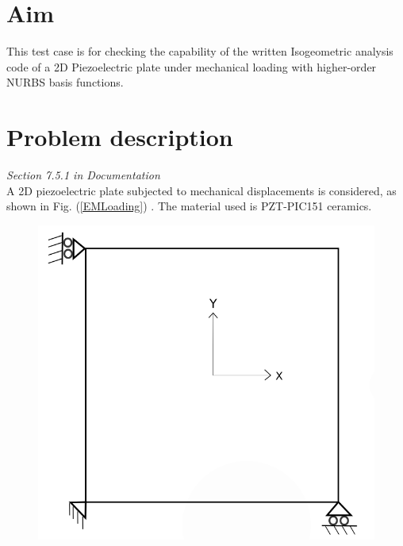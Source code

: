 \documentclass[12pt]{article}
\begin{document}
\section{Aim}
This test case is for checking the capability of the written Isogeometric analysis code of a 2D Piezoelectric plate under mechanical loading with higher-order NURBS basis functions.
\section{Problem description} \label{2DPPWMLPD}
\emph{Section 7.5.1 in Documentation}\\
A 2D piezoelectric plate subjected to mechanical displacements is considered, as shown in Fig. (\ref{EMLoading}) . The material used is PZT-PIC151 ceramics.

\begin{figure}[H]
	\centering
	\begin{minipage}{.5\textwidth}
		\centering
		\includegraphics[width=0.8\linewidth]{2DPlate.png}
		\label{2Dplate}
	\end{minipage}%
	\begin{minipage}{.5\textwidth}
		\centering

\end{minipage}
\end{figure}
\end{document}

